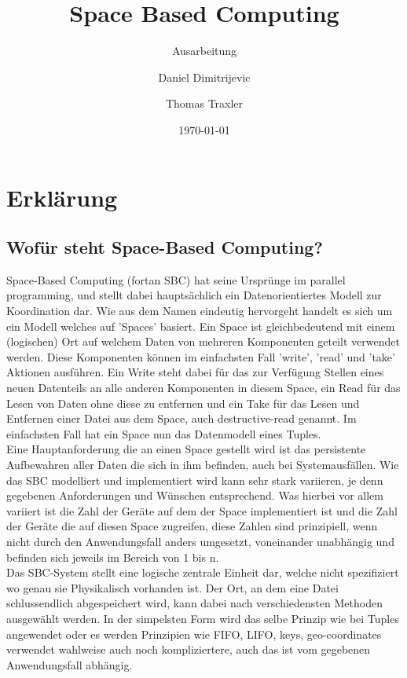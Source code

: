 \documentclass[a4paper,12pt]{scrreprt}
\begin{document}
\author{Daniel Dimitrijevic \and Thomas Traxler} %
\title{ Space Based Computing } %
\subject{VSDB} %
\subtitle{ Ausarbeitung } %
\date{\today} %
\publishers{5AHITT} %

\maketitle
\tableofcontents



\chapter{Erklärung}
	\section{Wofür steht Space-Based Computing?}
		Space-Based Computing (fortan SBC) hat seine Ursprünge im parallel programming, und stellt dabei hauptsächlich ein Datenorientiertes Modell zur Koordination dar. Wie aus dem Namen eindeutig hervorgeht handelt es sich um ein Modell welches auf 'Spaces' basiert. Ein Space ist gleichbedeutend mit einem (logischen) Ort auf welchem Daten von mehreren Komponenten geteilt verwendet werden. Diese Komponenten können im einfachsten Fall 'write', 'read' und 'take' Aktionen ausführen. Ein Write steht dabei für das zur Verfügung Stellen eines neuen Datenteils an alle anderen Komponenten in diesem Space, ein Read für das Lesen von Daten ohne diese zu entfernen und ein Take für das Lesen und Entfernen einer Datei aus dem Space, auch destructive-read genannt. Im einfachsten Fall hat ein Space nun das Datenmodell eines Tuples.\\ Eine Hauptanforderung die an einen Space  gestellt wird ist das persistente Aufbewahren aller Daten die sich in ihm befinden, auch bei Systemausfällen. Wie das SBC modelliert und implementiert wird kann sehr stark variieren, je denn gegebenen Anforderungen und Wünschen entsprechend. Was hierbei vor allem variiert ist die Zahl der Geräte auf dem der Space implementiert ist und die Zahl der Geräte die auf diesen Space zugreifen, diese Zahlen sind prinzipiell, wenn nicht durch den Anwendungsfall anders umgesetzt, voneinander unabhängig und befinden sich jeweils im Bereich von 1 bis n. \\   Das SBC-System stellt eine logische zentrale Einheit dar, welche nicht spezifiziert wo genau sie Physikalisch vorhanden ist. Der Ort, an dem eine Datei schlussendlich abgespeichert wird, kann dabei nach verschiedensten Methoden ausgewählt werden. In der simpelsten Form wird das selbe Prinzip wie bei Tuples angewendet %
		oder es werden Prinzipien  wie FIFO, LIFO, keys, geo-coordinates verwendet wahlweise auch noch kompliziertere, auch das ist vom gegebenen Anwendungsfall abhängig.
\end{document}
